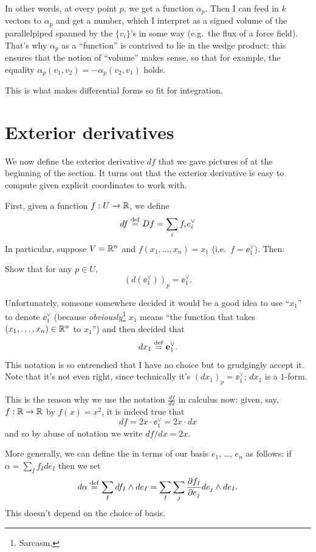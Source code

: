 In other words, at every point $p$, we get a function $\alpha_p$.
Then I can feed in $k$ vectors to $\alpha_p$ and get a number,
which I interpret as a signed volume of the parallelpiped spanned by the $\{v_i\}$'s
in some way (e.g.\ the flux of a force field).
That's why $\alpha_p$ as a ``function'' is contrived to lie in the wedge product:
this ensures that the notion of ``volume'' makes sense, so that for example,
the equality $\alpha_p(v_1, v_2) = -\alpha_p(v_2, v_1)$ holds.

This is what makes differential forms so fit for integration.


\section{Exterior derivatives}
We now define the exterior derivative $df$ that we gave
pictures of at the beginning of the section.
It turns out that the exterior derivative is easy to compute
given explicit coordinates to work with.

First, given a function $f : U \to \mathbb R$,
we define 
\[ df \overset{\mathrm{def}}{=} Df = \sum_i f_i e_i^\vee \]
In particular, suppose $V = \mathbb R^n$ and $f(x_1, \dots, x_n) = x_1$ (i.e.\ $f = \ee_1^\vee$). Then:
\begin{ques}
	Show that for any $p \in U$, \[ \left( d(\ee_1^\vee) \right)_p = \ee_1^\vee. \]
\end{ques}

\begin{abuse}
	Unfortunately, someone somewhere decided it would be a good idea to use ``$x_1$'' to denote $\ee_1^\vee$
	(because \emph{obviously}\footnote{Sarcasm.} $x_1$ means
	``the function that takes $(x_1, \dots, x_n) \in \mathbb R^n$ to $x_1$'')
	and then decided that \[ dx_1 \overset{\mathrm{def}}{=} \mathbf e_1^\vee. \]
	This notation is so entrenched that I have no choice but to grudgingly accept it.
	Note that it's not even right, since technically it's $(dx_1)_p = \ee_1^\vee$; $dx_1$ is a $1$-form.
	\label{abuse:dx}
\end{abuse}
\begin{remark}
	This is the reason why we use the notation $\frac{df}{dx}$ in calculus now:
	given, say, $f : \mathbb R \to \mathbb R$ by $f(x) = x^2$, it is indeed true that
	\[ df = 2x \cdot \ee_1^\vee = 2x \cdot dx \]
	and so by abuse of notation we write $df/dx = 2x$.
\end{remark}

More generally, we can define the  in terms of our basis $e_1$, \dots, $e_n$ as follows:
if $\alpha = \sum_I f_I de_I$ then we set
\[ d\alpha \overset{\mathrm{def}}{=} \sum_I df_I \wedge de_I = \sum_I \sum_j \frac{\partial f_I}{\partial e_j} de_j \wedge de_I. \]
This doesn't depend on the choice of basis.

